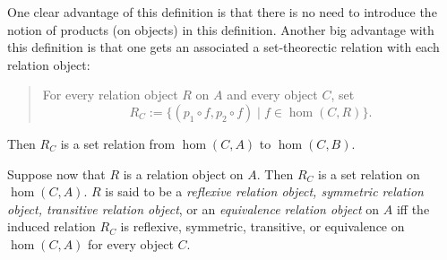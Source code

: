 \documentclass[12pt]{article}
\begin{document}
One clear advantage of this definition is that there is no need to introduce the notion of products (on objects) in this definition.  Another big advantage with this definition is that one gets an associated a set-theorectic relation with each relation object:
\begin{quote}
For every relation object $R$ on $A$ and every object $C$, set $$R_C:=\lbrace (p_1\circ f, p_2\circ f) \mid f \in \hom(C,R)\rbrace.$$
\end{quote}
Then $R_C$ is a set relation from $\hom(C,A)$ to $\hom(C,B)$.

Suppose now that $R$ is a relation object on $A$.  Then $R_C$ is a set relation on $\hom(C,A)$.  $R$ is said to be a \emph{reflexive relation object, symmetric relation object, transitive relation object}, or an \emph{equivalence relation object} on $A$ iff the induced relation $R_C$ is reflexive, symmetric, transitive, or equivalence on $\hom(C,A)$ for every object $C$.
\end{document}
